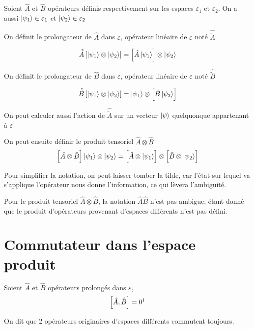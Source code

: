 Soient $\hat{A}$ et $\hat{B}$ opérateurs définis respectivement sur les espaces $\varepsilon_1$ et $\varepsilon_2$. On a aussi $\ket{\psi_1}\in\varepsilon_1$ et $\ket{\psi_2}\in\varepsilon_2$

On définit le prolongateur de $\hat{A}$ dans $\varepsilon$, opérateur linéaire de $\varepsilon$ noté $\hat{\tilde{A}}$

$$\hat{\tilde{A}} \left[ \ket{\psi_1} \otimes \ket{\psi_2} \right] = \left[\hat{A}\ket{\psi_1}\right]\otimes\ket{\psi_2}$$

On définit le prolongateur de $\hat{B}$ dans $\varepsilon$, opérateur linéaire de $\varepsilon$ noté $\hat{\tilde{B}}$

$$\hat{\tilde{B}} \left[ \ket{\psi_1} \otimes \ket{\psi_2} \right] = \ket{\psi_1} \otimes \left[\hat{B}\ket{\psi_2}\right]$$

On peut calculer aussi l'action de $\hat{\tilde{A}}$ sur un vecteur $\ket{\psi}$ quelquonque appartenant à $\varepsilon$

On peut ensuite définir le produit tensoriel $\hat{A}\otimes\hat{B}$
$$ \left[ \hat{A}\otimes\hat{B} \right]\ket{\psi_1}\otimes\ket{\psi_2} = \left[\hat{A}\otimes\ket{\psi_1}\right]\otimes\left[\hat{B}\otimes\ket{\psi_2}\right]$$

Pour simplifier la notation, on peut laisser tomber la tilde, car l'état sur lequel va s'applique l'opérateur nous donne l'information, ce qui lèvera l'ambiguité.

Pour le produit tensoriel $\hat{A}\otimes\hat{B}$, la notation $\hat{A}\hat{B}$ n'est pas ambigue, étant donné que le produit d'opérateurs provenant d'espaces différents n'est pas défini.

\section{Commutateur dans l'espace produit}

Soient $\hat{A}$ et $\hat{B}$ opérateurs prolongés dans $\varepsilon$,
$$ \left[\hat{A},\hat{B}\right] = 0\footnotemark $$

On dit que 2 opérateurs originaires d'espaces différents commutent toujours.